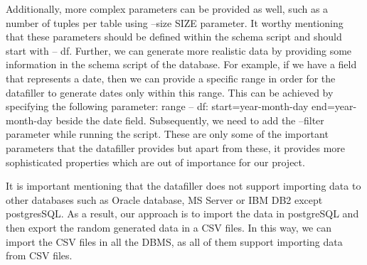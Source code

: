 Additionally, more complex parameters can be provided as well, such as a number of tuples per table using --size SIZE parameter. It worthy mentioning that these parameters should be defined within the schema script and should start with -- df.  Further, we can generate more realistic data by providing some information in the schema script of the database. For example, if we have a field that represents a date, then we can provide a specific range in order for the datafiller to generate dates only within this range. This can be achieved by specifying the following parameter: range -- df: start=year-month-day end=year-month-day beside the date field. Subsequently, we need to add the --filter parameter while running the script. These are only some of the important parameters that the datafiller provides but apart from these, it provides more sophisticated properties which are out of importance for our project.
 
It is important mentioning that the datafiller does not support importing data to other databases such as Oracle database, MS Server or IBM DB2 except postgresSQL. As a result, our approach is to import the data in postgreSQL and then export the random generated data in a CSV files. In this way, we can import the CSV files in all the DBMS, as all of them support importing data from CSV files.